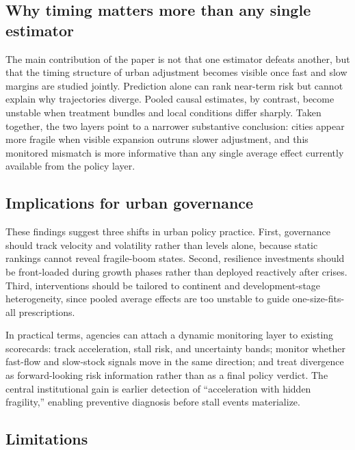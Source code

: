 \documentclass[11pt,a4paper]{article}
\begin{document}
\subsection{Why timing matters more than any single estimator}
The main contribution of the paper is not that one estimator defeats another, but that the timing structure of urban adjustment becomes visible once fast and slow margins are studied jointly.
Prediction alone can rank near-term risk but cannot explain why trajectories diverge.
Pooled causal estimates, by contrast, become unstable when treatment bundles and local conditions differ sharply.
Taken together, the two layers point to a narrower substantive conclusion: cities appear more fragile when visible expansion outruns slower adjustment, and this monitored mismatch is more informative than any single average effect currently available from the policy layer.

\subsection{Implications for urban governance}
These findings suggest three shifts in urban policy practice.
First, governance should track velocity and volatility rather than levels alone, because static rankings cannot reveal fragile-boom states.
Second, resilience investments should be front-loaded during growth phases rather than deployed reactively after crises.
Third, interventions should be tailored to continent and development-stage heterogeneity, since pooled average effects are too unstable to guide one-size-fits-all prescriptions.

In practical terms, agencies can attach a dynamic monitoring layer to existing scorecards: track acceleration, stall risk, and uncertainty bands; monitor whether fast-flow and slow-stock signals move in the same direction; and treat divergence as forward-looking risk information rather than as a final policy verdict.
The central institutional gain is earlier detection of ``acceleration with hidden fragility,'' enabling preventive diagnosis before stall events materialize.

\subsection{Limitations}
\end{document}

